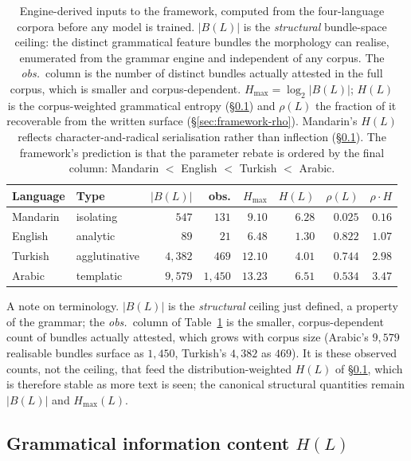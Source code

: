 \begin{table}[hbt!]
\centering
\begin{tabular}{llrrrrrr}
\toprule
Language & Type & $|B(L)|$ & obs. & $H_{\max}$ & $H(L)$ & $\rho(L)$ & $\rho \cdot H$ \\
\midrule
Mandarin & isolating     & $547$   & $131$   & $9.10$  & $6.28$ & $0.025$ & $0.16$ \\
English  & analytic      & $89$    & $21$    & $6.48$  & $1.30$ & $0.822$ & $1.07$ \\
Turkish  & agglutinative & $4{,}382$ & $469$ & $12.10$ & $4.01$ & $0.744$ & $2.98$ \\
Arabic   & templatic     & $9{,}579$ & $1{,}450$ & $13.23$ & $6.51$ & $0.534$ & $3.47$ \\
\bottomrule
\end{tabular}
\caption{Engine-derived inputs to the framework, computed from the four-language corpora before any model is trained. $|B(L)|$ is the \emph{structural} bundle-space ceiling: the distinct grammatical feature bundles the morphology can realise, enumerated from the grammar engine and independent of any corpus. The \emph{obs.}\ column is the number of distinct bundles actually attested in the full corpus, which is smaller and corpus-dependent. $H_{\max} = \log_2 |B(L)|$; $H(L)$ is the corpus-weighted grammatical entropy (\S\ref{sec:framework-H}) and $\rho(L)$ the fraction of it recoverable from the written surface (\S\ref{sec:framework-rho}). Mandarin's $H(L)$ reflects character-and-radical serialisation rather than inflection (\S\ref{sec:framework-H}). The framework's prediction is that the parameter rebate is ordered by the final column: Mandarin $<$ English $<$ Turkish $<$ Arabic.}
\label{tab:framework-inputs}
\end{table}
\FloatBarrier

A note on terminology. $|B(L)|$ is the \emph{structural} ceiling just defined, a property of the grammar; the \emph{obs.}\ column of Table~\ref{tab:framework-inputs} is the smaller, corpus-dependent count of bundles actually attested, which grows with corpus size (Arabic's $9{,}579$ realisable bundles surface as $1{,}450$, Turkish's $4{,}382$ as $469$). It is these observed counts, not the ceiling, that feed the distribution-weighted $H(L)$ of \S\ref{sec:framework-H}, which is therefore stable as more text is seen; the canonical structural quantities remain $|B(L)|$ and $H_{\max}(L)$.

\subsection{Grammatical information content $H(L)$}
\label{sec:framework-H}

